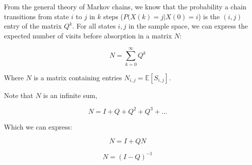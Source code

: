\documentclass[11pt]{article}
\newcommand{\E}{\mathbb{E}}
\begin{document}
From the general theory of Markov chains, we know that the probability a chain
transitions from state $i$ to $j$ in $k$ steps ($P(X(k) = j | X(0) = i$) is the
  $(i, j)$ entry of the matrix $Q^k$. For all states $i, j$ in the sample
  space, we can express the expected number of visits before absorption in a
  matrix $N$:

$$
N = \sum_{k=0}^{\infty} Q^k
$$

Where $N$ is a matrix containing entries $N_{i,j} = \E[S_{i,j}]$.

Note that $N$ is an infinite sum,

$$
N = I + Q + Q^2 + Q^3 + \ldots
$$

Which we can express: 

$$
N = I + QN
$$

$$
N = (I - Q)^{-1}
$$





\printbibliography
\end{document}
